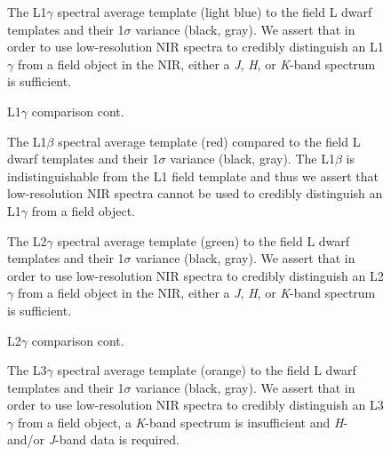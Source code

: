 \documentclass[12pt]{aastex6}
\begin{document}
\begin{figure}
    \caption{The L1$\gamma$ spectral average template (light blue) to the field L dwarf templates and their 1$\sigma$ variance (black, gray). We assert that in order to use low-resolution NIR spectra to credibly distinguish an L1$\gamma$ from a field object in the NIR, either a \emph{J}, \emph{H}, or \emph{K}-band spectrum is sufficient.}
    \label{fig:L1lg-field}
\end{figure}

\begin{figure}
  \caption{L1$\gamma$ comparison cont.}
\end{figure}

\begin{figure}
    \caption{The L1$\beta$ spectral average template (red) compared to the field L dwarf templates and their 1$\sigma$ variance (black, gray). The L1$\beta$ is indistinguishable from the L1 field template and thus we assert that low-resolution NIR spectra cannot be used to credibly distinguish an L1$\gamma$ from a field object.}
    \label{fig:L1b-field}
\end{figure}

\clearpage

\begin{figure}
    \caption{The L2$\gamma$ spectral average template (green) to the field L dwarf templates and their 1$\sigma$ variance (black, gray).
    We assert that in order to use low-resolution NIR spectra to credibly distinguish an L2$\gamma$ from a field object in the NIR, either a \emph{J}, \emph{H}, or \emph{K}-band spectrum is sufficient.}
    \label{fig:L2lg-field}
\end{figure}

\begin{figure}
  \caption{L2$\gamma$ comparison cont.}
\end{figure}

\begin{figure}
  \caption{The L3$\gamma$ spectral average template (orange) to the field L dwarf templates and their 1$\sigma$ variance (black, gray).
  We assert that in order to use low-resolution NIR spectra to credibly distinguish an L3$\gamma$ from a field object, a \emph{K}-band spectrum is insufficient and \emph{H}- and/or \emph{J}-band data is required.}
  \label{fig:L3lg-field}
\end{figure}
\end{document}
